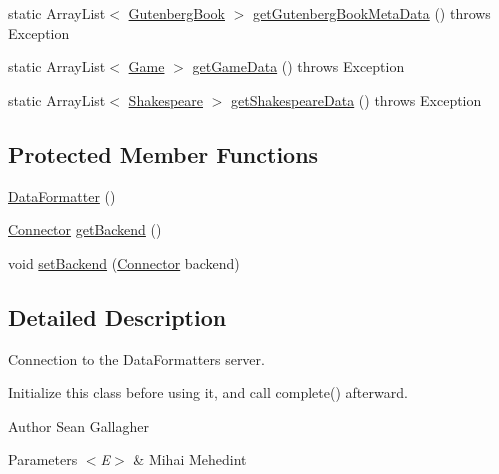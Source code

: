 \begin{DoxyCompactItemize}
\item 
static Array\+List$<$ \hyperlink{classbridges_1_1data__src__dependent_1_1_gutenberg_book}{Gutenberg\+Book} $>$ \hyperlink{classbridges_1_1connect_1_1_data_formatter_a4bd21bd830238db40b511474afc77b61}{get\+Gutenberg\+Book\+Meta\+Data} ()  throws Exception 
\item 
static Array\+List$<$ \hyperlink{classbridges_1_1data__src__dependent_1_1_game}{Game} $>$ \hyperlink{classbridges_1_1connect_1_1_data_formatter_a4098317468be22b4284156d6cd2212e1}{get\+Game\+Data} ()  throws Exception 
\item 
static Array\+List$<$ \hyperlink{classbridges_1_1data__src__dependent_1_1_shakespeare}{Shakespeare} $>$ \hyperlink{classbridges_1_1connect_1_1_data_formatter_abc1db0f1a9758b5fa97c167cb8fe4052}{get\+Shakespeare\+Data} ()  throws Exception 
\end{DoxyCompactItemize}
\subsection*{Protected Member Functions}
\begin{DoxyCompactItemize}
\item 
\hyperlink{classbridges_1_1connect_1_1_data_formatter_a31efd2251e98942e58e743dff213ef27}{Data\+Formatter} ()
\item 
\hyperlink{classbridges_1_1connect_1_1_connector}{Connector} \hyperlink{classbridges_1_1connect_1_1_data_formatter_a29cf4c2b0c5629d63a76b60569355c65}{get\+Backend} ()
\item 
void \hyperlink{classbridges_1_1connect_1_1_data_formatter_af9b878e5c092234a6ab5f8c11bee1fbd}{set\+Backend} (\hyperlink{classbridges_1_1connect_1_1_connector}{Connector} backend)
\end{DoxyCompactItemize}


\subsection{Detailed Description}
Connection to the Data\+Formatters server.

Initialize this class before using it, and call complete() afterward.

\begin{DoxyAuthor}{Author}
Sean Gallagher 
\end{DoxyAuthor}

\begin{DoxyParams}{Parameters}
{\em $<$\+E$>$} & Mihai Mehedint \\
\hline
\end{DoxyParams}



